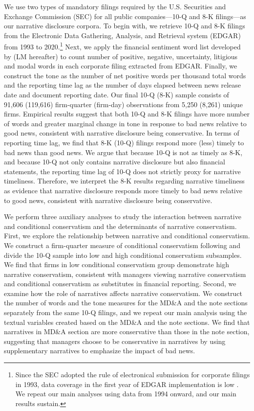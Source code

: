 \documentclass[a4paper]{article}
\begin{document}
\begin{spacing}{2}
We use two types of mandatory filings required by the U.S. Securities and Exchange Commission (SEC) for all public companies---10-Q and 8-K filings---as our narrative disclosure corpora. To begin with, we retrieve 10-Q and 8-K filings from the Electronic Data Gathering, Analysis, and Retrieval system (EDGAR) from 1993 to 2020.\footnote{Since the SEC adopted the rule of electronical submission for corporate filings in 1993, data coverage in the first year of EDGAR implementation is low . We repeat our main analyses using data from 1994 onward, and our main results sustain.} Next, we apply the financial sentiment word list developed by  (LM hereafter) to count number of positive, negative, uncertainty, litigious and modal words in each corporate filing extracted from EDGAR. Finally, we construct the tone as the number of net positive words per thousand total words and the reporting time lag as the number of days elapsed between news release date and document reporting date. Our final 10-Q (8-K) sample consists of 91,606 (119,616) firm-quarter (firm-day) observations from 5,250 (8,261) unique firms. Empirical results suggest that both 10-Q and 8-K filings have more number of words and greater marginal change in tone in response to bad news relative to good news, consistent with narrative disclosure being conservative. In terms of reporting time lag, we find that 8-K (10-Q) filings respond more (less) timely to bad news than good news. We argue that because 10-Q is not as timely as 8-K, and because 10-Q not only contains narrative disclosure but also financial statements, the reporting time lag of 10-Q does not strictly proxy for narrative timeliness. Therefore, we interpret the 8-K results regarding narrative timeliness as evidence that narrative disclosure responds more timely to bad news relative to good news, consistent with narrative disclosure being conservative.

We perform three auxiliary analyses to study the interaction between narrative and conditional conservatism and the determinants of narrative conservatism. First, we explore the relationship between narrative and conditional conservatism. We construct a firm-quarter measure of conditional conservatism following  and divide the 10-Q sample into low and high conditional conservatism subsamples. We find that firms in low conditional conservatism group demonstrate high narrative conservatism, consistent with managers viewing narrative conservatism and conditional conservatism as substitutes in financial reporting. Second, we examine how the role of narratives affects narrative conservatism. We construct the number of words and the tone measures for the MD\&A and the note sections separately from the same 10-Q filings, and we repeat our main analysis using the textual variables created based on the MD\&A and the note sections. We find that narratives in MD\&A section are more conservative than those in the note section, suggesting that managers choose to be conservative in narratives by using supplementary narratives to emphasize the impact of bad news.


\end{spacing}
\end{document}
